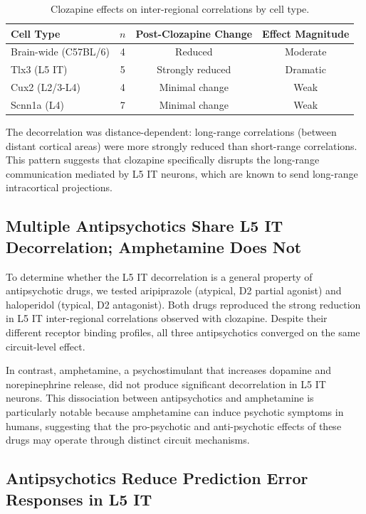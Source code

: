 \documentclass[11pt]{article}
\begin{document}
\begin{table}[h]
\centering
\caption{Clozapine effects on inter-regional correlations by cell type.}
\label{tab:clozapine}
\begin{tabular}{lccc}
\toprule
Cell Type & $n$ & Post-Clozapine Change & Effect Magnitude \\
\midrule
Brain-wide (C57BL/6) & 4 & Reduced & Moderate \\
Tlx3 (L5 IT) & 5 & Strongly reduced & Dramatic \\
Cux2 (L2/3-L4) & 4 & Minimal change & Weak \\
Scnn1a (L4) & 7 & Minimal change & Weak \\
\bottomrule
\end{tabular}
\end{table}

The decorrelation was distance-dependent: long-range correlations (between distant cortical areas) were more strongly reduced than short-range correlations. This pattern suggests that clozapine specifically disrupts the long-range communication mediated by L5 IT neurons, which are known to send long-range intracortical projections.

\subsection{Multiple Antipsychotics Share L5 IT Decorrelation; Amphetamine Does Not}

To determine whether the L5 IT decorrelation is a general property of antipsychotic drugs, we tested aripiprazole (atypical, D2 partial agonist) and haloperidol (typical, D2 antagonist). Both drugs reproduced the strong reduction in L5 IT inter-regional correlations observed with clozapine. Despite their different receptor binding profiles, all three antipsychotics converged on the same circuit-level effect.

In contrast, amphetamine, a psychostimulant that increases dopamine and norepinephrine release, did not produce significant decorrelation in L5 IT neurons. This dissociation between antipsychotics and amphetamine is particularly notable because amphetamine can induce psychotic symptoms in humans, suggesting that the pro-psychotic and anti-psychotic effects of these drugs may operate through distinct circuit mechanisms.

\subsection{Antipsychotics Reduce Prediction Error Responses in L5 IT}
\end{document}
